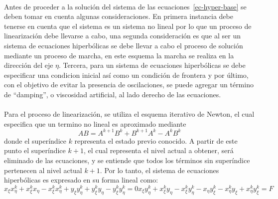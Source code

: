 \documentclass[letterpaper, openright, 12pt]{book}
\begin{document}
    \paragraph*{}
    Antes de proceder a la solución del sistema de las
    ecuaciones~\ref{ec-hyper-base} se deben tomar en cuenta algunas
    consideraciones. En primera instancia debe tenerse en cuenta que el sistema
    es un sistema no lineal por lo que un proceso de linearización debe llevarse
    a cabo, una segunda consideración es que al ser un sistema de ecuaciones
    hiperbólicas se debe llevar a cabo el proceso de solución mediante un
    proceso de marcha, en este esquema la marcha se realiza en la dirección del
    eje $\eta$. Tercera, para un sistema de ecuaciones hiperbólicas se debe
    especificar una condicion inicial así como un condición de frontera y por
    último, con el objetivo de evitar la presencia de oscilaciones, se puede
    agregar un término de ``damping'', o viscosidad artificial, al lado derecho
    de las ecuaciones.

    \paragraph*{}
    Para el proceso de linearización, se utiliza el esquema iterativo de
    Newton, el cual especifica que un termino no lineal es aproximado
    mediante
    \begin{equation}
        AB = A^{k + 1} B^{k} + B^{k + 1} A^{k} - A^{k} B^{k}
    \end{equation}
    donde el superíndice $k$ representa el estado previo conocido. A partir
    de este punto el superíndice $k + 1$, el cual representa el nivel actual
    a obtener, será eliminado de las ecuaciones, y se entiende que todos los
    términos sin superíndice pertenecen al nivel actual $k + 1$. Por lo
    tanto, el sistema de ecuaciones hiperbólicas es expresado en su forma
    lineal como:
    \begin{subequations}
        \begin{equation}
            x_{\xi} x_{\eta}^{k} + x_{\xi}^{k} x_{\eta}
            - x_{\xi}^{k} x_{\eta}^{k} + y_{\xi} y_{\eta}^{k}
            + y_{\xi}^{k} y_{\eta} - y_{\xi}^{k} y_{\eta}^{k} = 0
        \end{equation}
        \begin{equation}
            x_{\xi} y_{\eta}^{k} + x_{\xi}^{k} y_{\eta}
            - x_{\xi}^{k} y_{\eta}^{k} - x_{\eta} y_{\xi}^{k}
            - x_{\eta}^{k} y_{\xi} + x_{\eta}^{k} y_{\xi}^{k} = F
        \end{equation}
        \label{ec-hyper-linear}
    \end{subequations}
\end{document}
